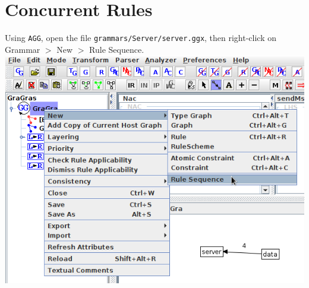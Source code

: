 \documentclass[12pt]{article}
\newenvironment{tutorialstep}
	{\hspace{-\parindent}\begin{minipage}{\textwidth}}
    {\vspace{.3cm}\end{minipage}}
\begin{document}
\pagebreak

\section{Concurrent Rules}

\begin{tutorialstep}
  Using \texttt{AGG}, open the file \texttt{grammars/Server/server.ggx}, then right-click on Grammar $>$ New $>$ Rule Sequence. \\

  \noindent
  \centering
  \includegraphics[scale = 0.6]{img/concurrent-rules/rule-sequence_01.png}
\end{tutorialstep}
\end{document}

